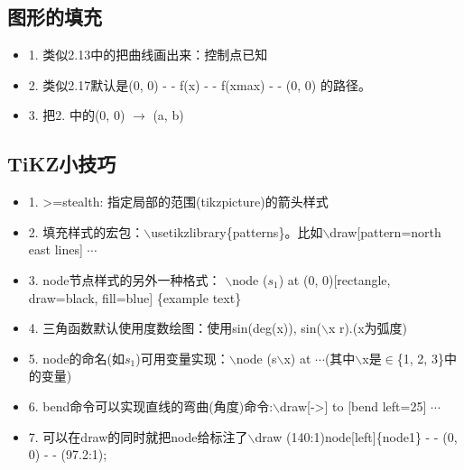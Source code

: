 \documentclass[fontset=windows]{article}
\begin{document}
\subsection{图形的填充}
\begin{itemize}
    \item 1. 类似2.13中的把曲线画出来：控制点已知
    \item 2. 类似2.17默认是(0, 0) - - f(x) - - f(xmax) - - (0, 0) 的路径。
    \item 3. 把2. 中的(0, 0) $\rightarrow$ (a, b)
\end{itemize}

\newpage





\newpage
\subsection{TiKZ小技巧}
\begin{itemize}
    \item 1. >=stealth: 指定局部的范围(tikzpicture)的箭头样式
    \item 2. 填充样式的宏包：$\backslash$usetikzlibrary\{patterns\}。比如$\backslash$draw[pattern=north east lines] $\cdots$
    \item 3. node节点样式的另外一种格式：
            $\backslash$node ($s_1$) at (0, 0)[rectangle, draw=black, fill=blue] \{example text\}
    \item 4. 三角函数默认使用度数绘图：使用sin(deg(x)), sin($\backslash$x r).(x为弧度)
    \item 5. node的命名(如$s_1$)可用变量实现：$\backslash$node (s$\backslash$x) at $\cdots$(其中$\backslash$x是$\in$\{1, 2, 3\}中的变量)
    \item 6. bend命令可以实现直线的弯曲(角度)命令:$\backslash$draw[->] to [bend left=25] $\cdots$
    \item 7. 可以在draw的同时就把node给标注了$\backslash$draw (140:1)node[left]\{node1\} - - (0, 0) - - (97.2:1);
\end{itemize}
\end{document}
